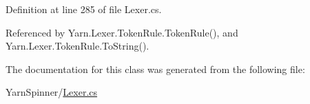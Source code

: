 Definition at line 285 of file Lexer.\-cs.



Referenced by Yarn.\-Lexer.\-Token\-Rule.\-Token\-Rule(), and Yarn.\-Lexer.\-Token\-Rule.\-To\-String().



The documentation for this class was generated from the following file\-:\begin{DoxyCompactItemize}
\item 
Yarn\-Spinner/\hyperlink{a00310}{Lexer.\-cs}\end{DoxyCompactItemize}
